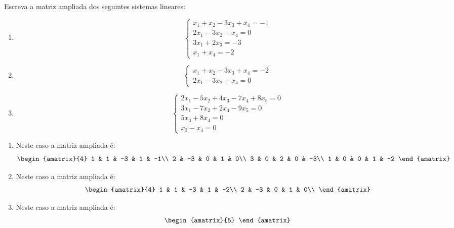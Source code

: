 \begin{exemplos}
    Escreva a matriz ampliada dos seguintes sistemas lineares:
    \begin{enumerate}[label={\arabic*})]
        \item \[\begin{cases} x_1 + x_2 - 3x_3 + x_4 = -1\\ 2x_1 - 3x_2 + x_4 = 0\\ 3x_1 + 2x_3 = -3\\ x_1 + x_4 = -2\end{cases}\]
        \item \[\begin{cases} x_1 + x_2 - 3x_3 + x_4 = -2\\ 2x_1 - 3x_2 + x_4 = 0\end{cases}\]
        \item \[\begin{cases} 2x_1 - 5x_2 + 4x_3 - 7x_4 + 8x_5 = 0\\ 3x_1 - 7x_2 + 2x_4 - 9x_5 = 0\\ 5x_3 + 8x_4 = 0\\ x_3 - x_4 = 0\end{cases}\]
    \end{enumerate}
    \begin{solucao}
        \begin{enumerate}[label={\arabic*})]
            \item Neste caso a matriz ampliada é:
                \[
                    \begin{amatrix}{4}
                        1 & 1 & -3 & 1 & -1\\
                        2 & -3 & 0 & 1 & 0\\
                        3 & 0 & 2 & 0 & -3\\
                        1 & 0 & 0 & 1 & -2
                    \end{amatrix}
                \]
            \item Neste caso a matriz ampliada é:
                \[
                    \begin{amatrix}{4}
                        1 & 1 & -3 & 1 & -2\\
                        2 & -3 & 0 & 1 & 0\\
                    \end{amatrix}
                \]
            \item Neste caso a matriz ampliada é:
                \[
                    \begin{amatrix}{5}

\end{amatrix}\]
\end{enumerate}
\end{solucao}
\end{exemplos}
